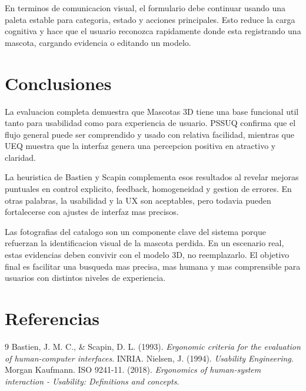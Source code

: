 \documentclass[12pt,a4paper]{article}
\begin{document}
En terminos de comunicacion visual, el formulario debe continuar usando una paleta estable para categoria, estado y acciones principales. Esto reduce la carga cognitiva y hace que el usuario reconozca rapidamente donde esta registrando una mascota, cargando evidencia o editando un modelo.

\section{Conclusiones}
La evaluacion completa demuestra que Mascotas 3D tiene una base funcional util tanto para usabilidad como para experiencia de usuario. PSSUQ confirma que el flujo general puede ser comprendido y usado con relativa facilidad, mientras que UEQ muestra que la interfaz genera una percepcion positiva en atractivo y claridad.

La heuristica de Bastien y Scapin complementa esos resultados al revelar mejoras puntuales en control explicito, feedback, homogeneidad y gestion de errores. En otras palabras, la usabilidad y la UX son aceptables, pero todavia pueden fortalecerse con ajustes de interfaz mas precisos.

Las fotografias del catalogo son un componente clave del sistema porque refuerzan la identificacion visual de la mascota perdida. En un escenario real, estas evidencias deben convivir con el modelo 3D, no reemplazarlo. El objetivo final es facilitar una busqueda mas precisa, mas humana y mas comprensible para usuarios con distintos niveles de experiencia.

\section*{Referencias}
\begin{thebibliography}{9}
 Bastien, J. M. C., \& Scapin, D. L. (1993). \textit{Ergonomic criteria for the evaluation of human-computer interfaces}. INRIA.
 Nielsen, J. (1994). \textit{Usability Engineering}. Morgan Kaufmann.
 ISO 9241-11. (2018). \textit{Ergonomics of human-system interaction - Usability: Definitions and concepts}.
\end{thebibliography}
\end{document}
